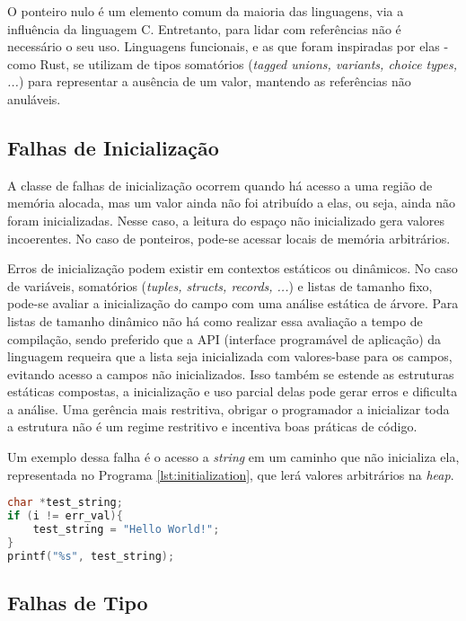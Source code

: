 O ponteiro nulo é um elemento comum da maioria das linguagens, via a influência da linguagem C. Entretanto, para lidar com referências não é necessário o seu uso. Linguagens funcionais, e as que foram inspiradas por elas - como Rust, se utilizam de tipos somatórios (\emph{tagged unions, variants, choice types, ...}) para representar a ausência de um valor, mantendo as referências não anuláveis.


\subsection{Falhas de Inicialização}
\label{sec:mem-error:init}

A classe de falhas de inicialização ocorrem quando há acesso a uma região de memória alocada, mas um valor ainda não foi atribuído a elas, ou seja, ainda não foram inicializadas. Nesse caso, a leitura do espaço não inicializado gera valores incoerentes. No caso de ponteiros, pode-se acessar locais de memória arbitrários.

Erros de inicialização podem existir em contextos estáticos ou dinâmicos. No caso de variáveis, somatórios (\emph{tuples, structs, records, ...}) e listas de tamanho fixo, pode-se avaliar a inicialização do campo com uma análise estática de árvore. Para listas de tamanho dinâmico não há como realizar essa avaliação a tempo de compilação, sendo preferido que a API (interface programável de aplicação) da linguagem requeira que a lista seja inicializada com valores-base para os campos, evitando acesso a campos não inicializados. Isso também se estende as estruturas estáticas compostas, a inicialização e uso parcial delas pode gerar erros e dificulta a análise. Uma gerência mais restritiva, obrigar o programador a inicializar toda a estrutura não é um regime restritivo e incentiva boas práticas de código.

Um exemplo dessa falha é o acesso a \emph{string} em um caminho que não inicializa ela, representada no Programa \ref{lst:initialization}, que lerá valores arbitrários na \emph{heap}.

\begin{lstlisting}[language=C, label={lst:initialization}, caption=Exemplo de uma Falha de Inicalização com \emph{Strings}]
char *test_string;
if (i != err_val){
	test_string = "Hello World!";
}
printf("%s", test_string);
\end{lstlisting}


\subsection{Falhas de Tipo}

